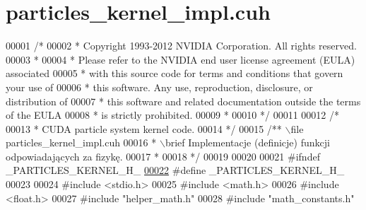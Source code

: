 \hypertarget{particles__kernel__impl_8cuh_source}{\section{particles\-\_\-kernel\-\_\-impl.\-cuh}
}

\begin{DoxyCode}
00001 \textcolor{comment}{/*}
00002 \textcolor{comment}{ * Copyright 1993-2012 NVIDIA Corporation.  All rights reserved.}
00003 \textcolor{comment}{ *}
00004 \textcolor{comment}{ * Please refer to the NVIDIA end user license agreement (EULA) associated}
00005 \textcolor{comment}{ * with this source code for terms and conditions that govern your use of}
00006 \textcolor{comment}{ * this software. Any use, reproduction, disclosure, or distribution of}
00007 \textcolor{comment}{ * this software and related documentation outside the terms of the EULA}
00008 \textcolor{comment}{ * is strictly prohibited.}
00009 \textcolor{comment}{ *}
00010 \textcolor{comment}{ */}
00011 
00012 \textcolor{comment}{/*}
00013 \textcolor{comment}{ * CUDA particle system kernel code.}
00014 \textcolor{comment}{ */}
00015  \textcolor{comment}{/** \(\backslash\)file particles\_kernel\_impl.cuh}
00016 \textcolor{comment}{  * \(\backslash\)brief Implementacje (definicje) funkcji odpowiadających za fizykę.}
00017 \textcolor{comment}{  *}
00018 \textcolor{comment}{  */}
00019 
00020 
00021 \textcolor{preprocessor}{#}\textcolor{preprocessor}{ifndef} \textcolor{preprocessor}{\_PARTICLES\_KERNEL\_H\_}
\hypertarget{particles__kernel__impl_8cuh_source_l00022}{}\hyperlink{particles__kernel__impl_8cuh_a5de512cb982bf8e9102c9e80ae68a7f2}{00022} \textcolor{preprocessor}{#}\textcolor{preprocessor}{define} \textcolor{preprocessor}{\_PARTICLES\_KERNEL\_H\_}
00023 
00024 \textcolor{preprocessor}{#}\textcolor{preprocessor}{include} \textcolor{preprocessor}{<}\textcolor{preprocessor}{stdio}\textcolor{preprocessor}{.}\textcolor{preprocessor}{h}\textcolor{preprocessor}{>}
00025 \textcolor{preprocessor}{#}\textcolor{preprocessor}{include} \textcolor{preprocessor}{<}\textcolor{preprocessor}{math}\textcolor{preprocessor}{.}\textcolor{preprocessor}{h}\textcolor{preprocessor}{>}
00026 \textcolor{preprocessor}{#}\textcolor{preprocessor}{include} \textcolor{preprocessor}{<}\textcolor{keywordtype}{float}\textcolor{preprocessor}{.}\textcolor{preprocessor}{h}\textcolor{preprocessor}{>}
00027 \textcolor{preprocessor}{#}\textcolor{preprocessor}{include} \textcolor{preprocessor}{"helper\_math.h"}
00028 \textcolor{preprocessor}{#}\textcolor{preprocessor}{include} \textcolor{preprocessor}{"math\_constants.h"}

\end{DoxyCode}
